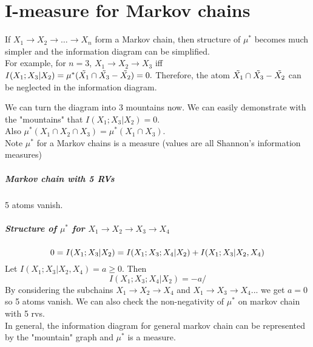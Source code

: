 \documentclass[../main.tex]{subfiles}
\begin{document}
\chapter{I-measure for Markov chains}
If $X_1\to X_2\to\dots\to X_n$ form a Markov chain, then structure of $\mu^*$ becomes much simpler and the information diagram can be simplified.\\
For example, for $n=3$, $X_1\to X_2\to X_3$ iff $I(X_1;X_3|X_2)=\mu^*(\Tilde{X_1}\cap\Tilde{X_3}-\Tilde{X_2}) =0. $
Therefore, the atom $\Tilde{X_1}\cap\Tilde{X_3}-\Tilde{X_2}$ can be neglected in the information diagram.

We can turn the diagram into 3 mountains now.
We can easily demonstrate with the "mountains" that $I(X_1;X_3|X_2)=0$. \\
Also $\mu^*(X_1\cap X_2\cap X_3)=\mu^*(X_1\cap X_3)$.\\
Note $\mu^*$ for a Markov chains is a measure (values are all Shannon's information measures)
\paragraph{Markov chain with 5 RVs}
5 atoms vanish.
\paragraph{Structure of $\mu^*$ for $X_1\to X_2\to X_3\to X_4$}
\[
0 = I(X_1;X_3|X_2) = I(X_1;X_3;X_4|X_2)+I(X_1;X_3|X_2,X_4) 
\]
Let $I(X_1;X_3|X_2,X_4)=a \geq 0$. Then \[
I(X_1;X_3;X_4|X_2)=-a/
\]
By considering the subchains $X_1\to X_2\to X_4$ and $X_1\to X_3\to X_4$... we get $a=0$ so 5 atoms vanish. We can also check the non-negativity of $\mu^*$ on markov chain with 5 rvs.\\
In general, the information diagram for general markov chain can be represented by the "mountain" graph and $\mu^*$ is a measure.
\end{document}
